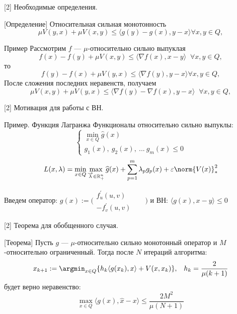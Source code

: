 \begin{frame}{[2] Необходимые определения.}
    \begin{block}{[Определение] Относительная сильная монотонность}
        $$ \mu V(y, x) + \mu V(x, y) \leq \langle g(y) - g(x), y - x \rangle  \forall x, y \in Q,$$
    \end{block}
    \begin{exampleblock}{Пример}
        Рассмотрим $f$ --- $\mu$-относительно сильно выпуклая \\
        $$f(x) - f(y) + \mu V(x, y) \leq \langle \nabla{f(x)}, x - y \rangle  \;\; \forall x, y \in Q, $$
        то
        $$f(y) - f(x) + \mu V(y, x) \leq \langle \nabla{f(y)}, y - x \rangle  \forall x, y \in Q, $$
        После сложения последних неравенств, получаем
        $$\mu V(x, y) + \mu V(y, x)\leq \langle \nabla{f(y)} - \nabla{f(x)}, y - x \rangle \;\; \forall x, y \in Q,$$
    \end{exampleblock}
\end{frame}


\begin{frame}{[2] Мотивация для работы с ВН.}
    \begin{exampleblock}{Пример. Функция Лагранжа}
        Функционалы относительно сильно выпуклы:
        $$
        \left\{\begin{aligned}
            \min_{x \in Q} \widehat{g}(x)\\
             g_1(x){,\:}g_2(x){,\:}...\:g_m(x) \leq 0
        \end{aligned}\right.
        $$
        $$L(x, \lambda) = \min_{x \in Q} \max_{\overrightarrow{\lambda} \in \mathbb{R}_+^n} \widehat{g}(x) + \sum_{p=1}^{m} \lambda_p g_p(x) + \varepsilon \norm{V(x)}_*^2$$
    \end{exampleblock}
    Введем оператор:
    $ g(x) := \Bigg( 
      \begin{aligned}
        f^{'}_{u}(u,v)&&\\
        -f^{'}_{v}(u,v)&&
      \end{aligned}
      \Bigg) $
    и ВН: $\langle g(x), x - y \rangle \leq 0$
\end{frame}


\begin{frame}{[2] Теорема для обобщенного случая.}
    \begin{block}{[Теорема]}
        Пусть $g$ --- $\mu$-относительно сильно монотонный оператор и $M$-относительно ограниченный. Тогда после $N$ итераций алгоритма: 
        $$ x_{k+1} := \argmin_{x \in Q} \{ h_k \langle g(x_k), x\rangle + V(x, x_k)\}, \;\;\; h_k = \frac{2}{\mu (k+1)}$$
        будет верно неравенство:
        \begin{equation}\label{eq:2}
            \max_{x \in Q} \langle g(x), \widehat{x} - x\rangle \leq \frac{2 M^2}{\mu (N+1)}
        \end{equation}
    \end{block}
\end{frame}


